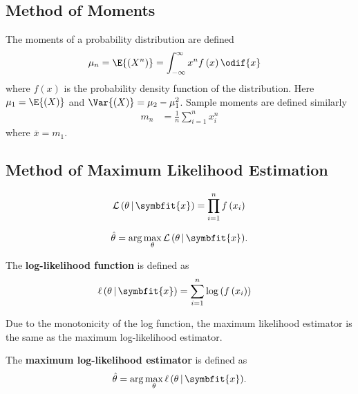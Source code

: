 \documentclass{article}
\begin{document}
\begin{multicols}{3}
\subsection{Method of Moments}
The moments of a probability distribution are defined
\begin{align*}
    \mu_n & = \E{\left( X^n \right)} = \int_{-\infty}^\infty x^n f\left( x \right) \odif{x}
\end{align*}
where \(f\left( x \right)\) is the probability density function of the distribution.
Here \(\mu_1 = \E{\left( X \right)}\) and \(\Var{\left( X \right)} = \mu_2 - \mu_1^2\).
Sample moments are defined similarly
\begin{align*}
    m_n & = \frac{1}{n} \sum_{i = 1}^n x_i^n
\end{align*}
where \(\overline{x} = m_1\).
\subsection{Method of Maximum Likelihood Estimation}
\begin{definition}
    \begin{equation*}
        \mathcal{L}\left( \theta \,\vert\, \symbfit{x} \right) = \prod_{i = 1}^n f\left( x_i \right) \\
    \end{equation*}
\end{definition}
\begin{definition}
    \begin{equation*}
        \hat{\theta} = \arg\max_\theta{\mathcal{L}\left( \theta \,\vert\, \symbfit{x} \right)}.
    \end{equation*}
\end{definition}
\begin{definition}
    The \textbf{log-likelihood function} is defined as
    \begin{align*}
        \ell\left( \theta \,\vert\, \symbfit{x} \right)& = \sum_{i = 1}^n \log{\left( f\left( x_i \right) \right)}
    \end{align*}
\end{definition}
Due to the monotonicity of the log function, the maximum likelihood estimator is the same as the maximum log-likelihood estimator.
\begin{definition}
    The \textbf{maximum log-likelihood estimator} is defined as
    \begin{equation*}
        \hat{\theta} = \arg\max_\theta{\ell\left( \theta \,\vert\, \symbfit{x} \right)}.
    \end{equation*}
\end{definition}

\end{multicols}
\end{document}
